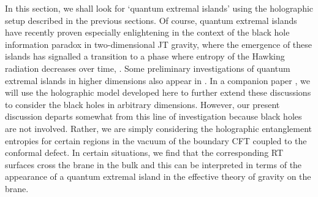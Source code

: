 
In this section, we shall look for `quantum extremal islands' using the holographic setup described in the previous sections. Of course, quantum extremal islands have recently proven especially enlightening in the context of the black hole information paradox in two-dimensional JT gravity, where the emergence of these islands has signalled a transition to a phase where entropy of the Hawking radiation decreases over time, \eg \cite{Almheiri:2019psf, Almheiri:2019hni, Almheiri:2019yqk, Chen:2019uhq, Penington:2019kki, Almheiri:2019qdq, Chen:2019iro}. Some preliminary investigations of quantum extremal islands in higher dimensions also appear in \cite{Penington:2019npb,Almheiri:2019psy}. In a companion paper \cite{QEI}, we will use the holographic model developed here to further extend these discussions to consider the black holes in arbitrary dimensions. However, our present discussion departs somewhat from this line of investigation because black holes are not involved. Rather, we are simply considering the holographic entanglement entropies for certain regions in the vacuum of the boundary CFT coupled to the conformal defect. In certain situations, we find that the corresponding RT surfaces cross the brane in the bulk and this can be interpreted in terms of the appearance of a quantum extremal island in the effective theory of gravity on the brane.


